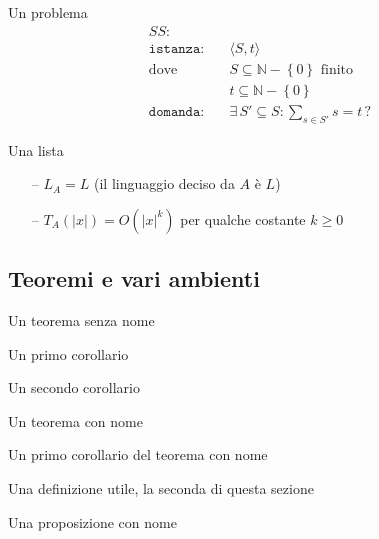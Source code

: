 Un problema
\begin{align*}
    SS: & \\
    \texttt{istanza:} \quad &
    \langle
        S,t
    \rangle
    \\
    \text{dove} \quad &
    S \subseteq \mathbb{N} - \left\{ 0 \right\} \text{ finito}
    \\
    &
    t \subseteq \mathbb{N} - \left\{ 0 \right\} \\
    \texttt{domanda:} \quad &
    \exists \, S' \subseteq S : \sum_{s \in S'}^{} s = t \, ?
\end{align*}

Una lista
\begin{itemize}[noitemsep,parsep=0pt,partopsep=0pt,topsep=0pt]
    \item[--] $L_A = L$ (il linguaggio deciso da $A$ è $L$)
    \item[--] $T_A(|x|) = O(|x|^k)$ per qualche costante $k \geq 0$
\end{itemize}

\subsection{Teoremi e vari ambienti }

\begin{theorem}
    Un teorema senza nome
\end{theorem}

\begin{corollario}
    Un primo corollario
\end{corollario}

\begin{corollario}
    Un secondo corollario
\end{corollario}

\begin{theorem}
    Un teorema con nome
\end{theorem}

\begin{corollario}
    Un primo corollario del teorema con nome
\end{corollario}

\begin{definition}
    Una definizione utile, la seconda di questa sezione
\end{definition}

\begin{proposizione}
    Una proposizione con nome
\end{proposizione}

